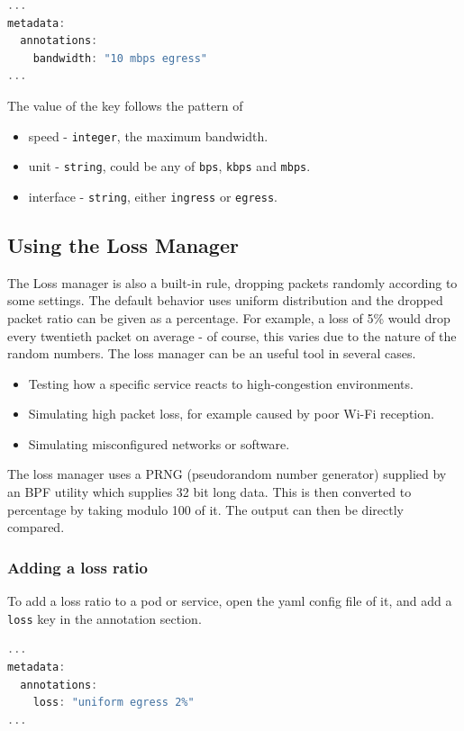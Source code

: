 \begin{lstlisting}[language={C++}]
...
metadata:
  annotations:
    bandwidth: "10 mbps egress"
...
\end{lstlisting}
\noindent
The value of the key follows the pattern of

\begin{itemize}
	\item speed - \texttt{integer}, the maximum bandwidth.
	\item unit - \texttt{string}, could be any of \texttt{bps}, \texttt{kbps} and \texttt{mbps}.
	\item interface - \texttt{string}, either \texttt{ingress} or \texttt{egress}.
\end{itemize}

\subsection{Using the Loss Manager}
The Loss manager is also a built-in rule, dropping packets randomly according to some settings. The default behavior uses uniform distribution and the dropped packet ratio can be given as a percentage. For example, a loss of 5\% would drop every twentieth packet on average - of course, this varies due to the nature of the random numbers. The loss manager can be an useful tool in several cases.
\begin{itemize}
	\item Testing how a specific service reacts to high-congestion environments. 
	\item Simulating high packet loss, for example caused by poor Wi-Fi reception.
	\item Simulating misconfigured networks or software.
\end{itemize}

\noindent
The loss manager uses a PRNG (pseudorandom number generator) supplied by an BPF utility which supplies 32 bit long data. This is then converted to percentage by taking modulo 100 of it. The output can then be directly compared.

\subsubsection{Adding a loss ratio}
To add a loss ratio to a pod or service, open the yaml config file of it, and add a \texttt{loss} key in the annotation section.

\begin{lstlisting}[language={C++}]
...
metadata:
  annotations:
    loss: "uniform egress 2%"
...
\end{lstlisting}

